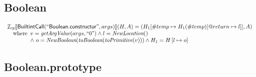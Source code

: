 \subsection{Boolean}
\[
\begin{array}{l}
\mathcal{I} _{cp}\llbracket \mbox{\textsf{BuiltintCall}}(``\mbox{\textsf{Boolean.constructor}}",args)\rrbracket(H,A)
  = (H_1[\#temp \mapsto H_1(\#temp)[@return \mapsto l]], A)\\
\quad{\rm where}\begin{array}[t]{l}
  v = \emph{getArgValue}(args, ``0") \land l=\emph{NewLocation}()\\
  \land\ o=\emph{NewBoolean}(\emph{toBoolean}(\emph{toPrimitive}(v))) \land H_1=H\left[l\mapsto o\right]\end{array}\\


\end{array}
\]


\subsection{Boolean.prototype}
